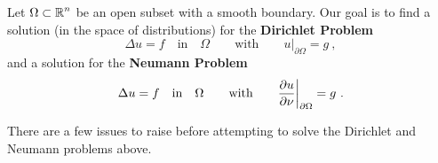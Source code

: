 Let $\displaystyle \Omega \subset \mathbb{R}^n$ be an open subset with a
smooth boundary.
Our goal is to find a solution (in the space of distributions) for the
{\bfseries Dirichlet Problem}
\begin{equation} \label{laplace_diri_probl}
\Delta u = f \quad \text{in} \quad \Omega \qquad \text{with}
\qquad u\big|_{\partial \Omega} = g \ ,
\end{equation}
and a solution for the
{\bfseries Neumann Problem}
\begin{equation} \label{laplace_neum_probl}
\Delta u = f \quad \text{in} \quad \Omega \qquad \text{with} \qquad
\frac{\partial{u}}{\partial \mathbf{\nu}}\bigg|_{\partial \Omega} = g \ .
\end{equation}

There are a few issues to raise before attempting to solve the Dirichlet
and Neumann problems above.
